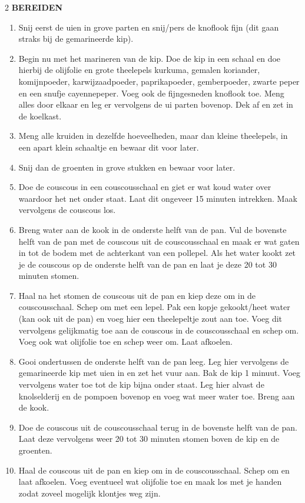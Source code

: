 \begin{paracol}{2}
\uppercase{\textbf{Bereiden}}
\begin{enumerate}
    \item Snij eerst de uien in grove parten en snij/pers de knoflook fijn (dit gaan straks bij de gemarineerde kip).
    \item Begin nu met het marineren van de kip. Doe de kip in een schaal en doe hierbij de olijfolie en grote theelepels kurkuma, gemalen koriander, komijnpoeder, karwijzaadpoeder, paprikapoeder, gemberpoeder, zwarte peper en een snufje cayennepeper. Voeg ook de fijngesneden knoflook toe. Meng alles door elkaar en leg er vervolgens de ui parten bovenop. Dek af en zet in de koelkast.
    \item Meng alle kruiden in dezelfde hoeveelheden, maar dan kleine theelepels, in een apart klein schaaltje en bewaar dit voor later.
    \item Snij dan de groenten in grove stukken en bewaar voor later.
    \item Doe de couscous in een couscousschaal en giet er wat koud water over waardoor het net onder staat. Laat dit ongeveer 15 minuten intrekken. Maak vervolgens de couscous los.
    \item Breng water aan de kook in de onderste helft van de pan. Vul de bovenste helft van de pan met de couscous uit de couscousschaal en maak er wat gaten in tot de bodem met de achterkant van een pollepel. Als het water kookt zet je de couscous op de onderste helft van de pan en laat je deze 20 tot 30 minuten stomen.
    \item Haal na het stomen de couscous uit de pan en kiep deze om in de couscousschaal. Schep om met een lepel. Pak een kopje gekookt/heet water (kan ook uit de pan) en voeg hier een theelepeltje zout aan toe. Voeg dit vervolgens gelijkmatig toe aan de couscous in de couscousschaal en schep om. Voeg ook wat olijfolie toe en schep weer om. Laat afkoelen.
    \item Gooi ondertussen de onderste helft van de pan leeg. Leg hier vervolgens de gemarineerde kip met uien in en zet het vuur aan. Bak de kip 1 minuut. Voeg vervolgens water toe tot de kip bijna onder staat. Leg hier alvast de knolselderij en de pompoen bovenop en voeg wat meer water toe. Breng aan de kook.
    \item Doe de couscous uit de couscousschaal terug in de bovenste helft van de pan. Laat deze vervolgens weer 20 tot 30 minuten stomen boven de kip en de groenten.
    \item Haal de couscous uit de pan en kiep om in de couscousschaal. Schep om en laat afkoelen. Voeg eventueel wat olijfolie toe en maak los met je handen zodat zoveel mogelijk klontjes weg zijn.

\end{enumerate}
\end{paracol}
